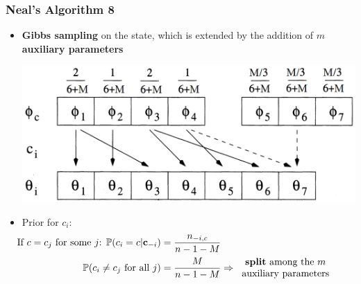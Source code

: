 \begin{frame}
	\frametitle{Neal's Algorithm 8}
	\begin{itemize}
		\item \textbf{Gibbs sampling} on the state, which is extended by the addition of $m$ \textbf{auxiliary parameters} \\
        \begin{center}
        	\includegraphics[scale=0.35]{etc/neal8.png}
        \end{center}
		
        \item Prior for $c_{i}$:
            \begin{align*}
            \hspace{-25pt}
            \vspace{-12pt}
                \text{If $c=c_j$ for some $j$: } \PP(c_i=c | \textbf c_{-i}) &= \frac{n_{-i,c}}{n-1-M}  \\
                \PP(c_{i}\neq c_{j} \text{ for all } j) &=\frac{M }{n-1-M}  \Rightarrow 
                \begin{tabular}{c}
                \textbf{split} among the $m$ \\
                auxiliary parameters 
                \end{tabular}
            \end{align*}	
	\end{itemize}
\end{frame}


